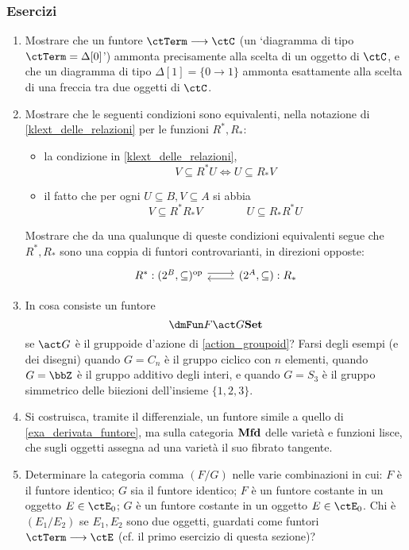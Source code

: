 \subsubsection*{Esercizi}
\begin{enumerate}
	\item Mostrare che un funtore $\ctTerm \fun\ctC$ (un `diagramma di tipo $\ctTerm = \Delta[0]$') ammonta precisamente alla scelta di un oggetto di $\ctC$, e che un diagramma di tipo $\Delta[1] = \{0\to 1\}$ ammonta esattamente alla scelta di una freccia tra due oggetti di $\ctC$.
	\item Mostrare che le seguenti condizioni sono equivalenti, nella notazione di \ref{klext_delle_relazioni} per le funzioni \(R^*,R_*\):
	      \begin{itemize}
		      \item la condizione in \ref{klext_delle_relazioni},
		            \[V\subseteq R^*U\iff U\subseteq R_*V\]
		      \item il fatto che per ogni \(U\subseteq B,V\subseteq A\) si abbia
		            \[V\subseteq R^*R_*V\qquad\qquad U\subseteq R_*R^*U\]
	      \end{itemize}
	      Mostrare che da una qualunque di queste condizioni equivalenti segue che \(R^*,R_*\) sono una coppia di funtori controvarianti, in direzioni opposte:
	      \[\begin{tikzcd}
			      R^* : (2^B,\subseteq)^\op \ar[r, shift left] & (2^A,\subseteq) : R_* \ar[l, shift left]
		      \end{tikzcd}\]
	\item In cosa consiste un funtore
	\[\dmFun F {\act G}\ctSet\]
	se $\act G$ è il gruppoide d'azione di \ref{action_groupoid}? Farsi degli esempi (e dei disegni) quando $G=C_n$ è il gruppo ciclico con $n$ elementi, quando $G=\bbZ$ è il gruppo additivo degli interi, e quando $G=S_3$ è il gruppo simmetrico delle biiezioni dell'insieme $\{1,2,3\}$.
	\item Si costruisca, tramite il differenziale, un funtore simile a quello di \ref{exa_derivata_funtore}, ma sulla categoria \(\mathbf{Mfd}\) delle varietà e funzioni lisce, che sugli oggetti assegna ad una varietà il suo fibrato tangente.
	\item Determinare la categoria comma $(F/G)$ nelle varie combinazioni in cui: $F$ è il funtore identico; $G$ sia il funtore identico; $F$ è un funtore costante in un oggetto $E\in\ctE_0$; $G$ è un funtore costante in un oggetto $E\in\ctE_0$. Chi è $(E_1/E_2)$ se $E_1,E_2$ sono due oggetti, guardati come funtori $\ctTerm \fun\ctE$ (cf. il primo esercizio di questa sezione)?
\end{enumerate}

